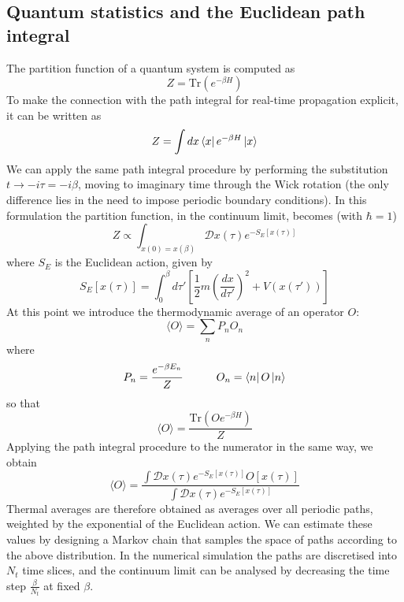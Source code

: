 \documentclass[10pt,a4paper]{article}
\begin{document}
\subsection{Quantum statistics and the Euclidean path integral}
The partition function of a quantum system is computed as
\begin{equation}
    Z = \text{Tr}(e^{-\beta H})
\end{equation}
To make the connection with the path integral for real-time propagation explicit,
it can be written as
\begin{equation}
    Z = \int dx \bra{x} e^{-\beta H} \ket{x}
\end{equation}
We can apply the same path integral procedure by performing the substitution
$t \to -i\tau = -i\beta$, moving to imaginary time through the Wick rotation
(the only difference lies in the need to impose periodic boundary conditions).
In this formulation the partition function, in the continuum limit, becomes
(with $\hbar=1$)
\begin{equation}
    Z \propto \int_{x(0)=x(\beta)} \mathcal{D}x(\tau) e^{-S_E[x(\tau)]}
\end{equation}
where $S_E$ is the Euclidean action, given by
\begin{equation}
    S_E[x(\tau)] = \int_0^\beta d\tau' \left[ \frac{1}{2} m \left( \frac{dx}{d\tau'} \right)^2 + V(x(\tau')) \right]
\end{equation}
At this point we introduce the thermodynamic average of an operator $O$:
\begin{equation}
    \langle O \rangle = \sum_{n} P_{n} O_{n}
\end{equation}
where
\begin{equation*}
    P_{n} = \frac{e^{-\beta E_n}}{Z} \quad\quad\quad O_{n} = \bra{n} O \ket{n}
\end{equation*}
so that
\begin{equation}
    \langle O \rangle = \frac{\text{Tr}(O e^{-\beta H})}{Z}
\end{equation}
Applying the path integral procedure to the numerator in the same way, we obtain
\begin{equation}
    \langle O \rangle = \frac{\int \mathcal{D}x(\tau) e^{-S_E[x(\tau)]} O[x(\tau)]}{\int \mathcal{D}x(\tau) e^{-S_E[x(\tau)]}}
\end{equation}
Thermal averages are therefore obtained as averages over all periodic paths,
weighted by the exponential of the Euclidean action. We can estimate these values
by designing a Markov chain that samples the space of paths according to the above
distribution. In the numerical simulation the paths are discretised into $N_t$ time
slices, and the continuum limit can be analysed by decreasing the time step
$\frac{\beta}{N_t}$ at fixed $\beta$.
\end{document}
